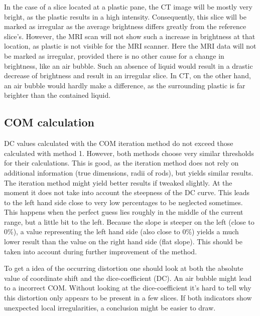 In the case of a slice located at a plastic pane, the CT image will be mostly very bright, as the plastic results in a high intensity.
Consequently, this slice will be marked as irregular as the average brightness differs greatly from the reference slice's.
However, the MRI scan will not show such a increase in brightness at that location, as plastic is not visible for the MRI scanner.
Here the MRI data will not be marked as irregular, provided there is no other cause for a change in brightness, like an air bubble.
Such an absence of liquid would result in a drastic decrease of brightness and result in an irregular slice.
In CT, on the other hand, an air bubble would hardly make a difference, as the surrounding plastic is far brighter than the contained liquid.

\subsection{COM calculation}
DC values calculated with the COM iteration method do not exceed those calculated with method 1.
However, both methods choose very similar thresholds for their calculations.
This is good, as the iteration method does not rely on additional information (true dimensions, radii of rods), but yields similar results.
The iteration method might yield better results if tweaked slightly.
At the moment it does not take into account the steepness of the DC curve.
This leads to the left hand side close to very low percentages to be neglected sometimes.
This happens when the perfect guess lies roughly in the middle of the current range, but a little bit to the left.
Because the slope is steeper on the left (close to 0\%), a value representing the left hand side (also close to 0\%) yields a much lower result than the value on the right hand side (flat slope).
This should be taken into account during further improvement of the method.




To get a idea of the occurring distortion one should look at both the absolute value of coordinate shift and the dice-coefficient (DC).
An air bubble might lead to a incorrect COM. Without looking at the dice-coefficient it's hard to tell why this distortion only appears to be present in a few slices.
If both indicators show unexpected local irregularities, a conclusion might be easier to draw.

